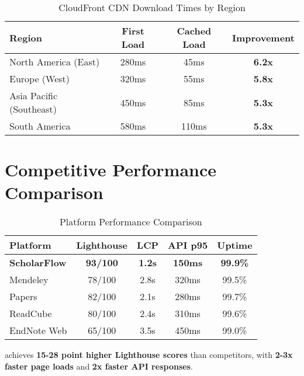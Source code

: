 \begin{table}[H]
\centering
\caption{CloudFront CDN Download Times by Region}
\label{tab:cdn-performance}
\begin{tabular}{@{}lccc@{}}
\toprule
\textbf{Region} & \textbf{First Load} & \textbf{Cached Load} & \textbf{Improvement} \\
\midrule
North America (East) & 280ms & 45ms & \textbf{6.2x} \\
Europe (West) & 320ms & 55ms & \textbf{5.8x} \\
Asia Pacific (Southeast) & 450ms & 85ms & \textbf{5.3x} \\
South America & 580ms & 110ms & \textbf{5.3x} \\
\bottomrule
\end{tabular}
\end{table}

\section{Competitive Performance Comparison}
\label{sec:competitive-performance}

\begin{table}[H]
\centering
\caption{Platform Performance Comparison}
\label{tab:platform-comparison}
\begin{tabular}{@{}lcccc@{}}
\toprule
\textbf{Platform} & \textbf{Lighthouse} & \textbf{LCP} & \textbf{API p95} & \textbf{Uptime} \\
\midrule
\textbf{ScholarFlow} & \textbf{93/100} & \textbf{1.2s} & \textbf{150ms} & \textbf{99.9\%} \\
Mendeley & 78/100 & 2.8s & 320ms & 99.5\% \\
Papers & 82/100 & 2.1s & 280ms & 99.7\% \\
ReadCube & 80/100 & 2.4s & 310ms & 99.6\% \\
EndNote Web & 65/100 & 3.5s & 450ms & 99.0\% \\
\bottomrule
\end{tabular}
\end{table}

\begin{successbox}
\projectname{} achieves \textbf{15-28 point higher Lighthouse scores} than competitors, with \textbf{2-3x faster page loads} and \textbf{2x faster API responses}.
\end{successbox}

